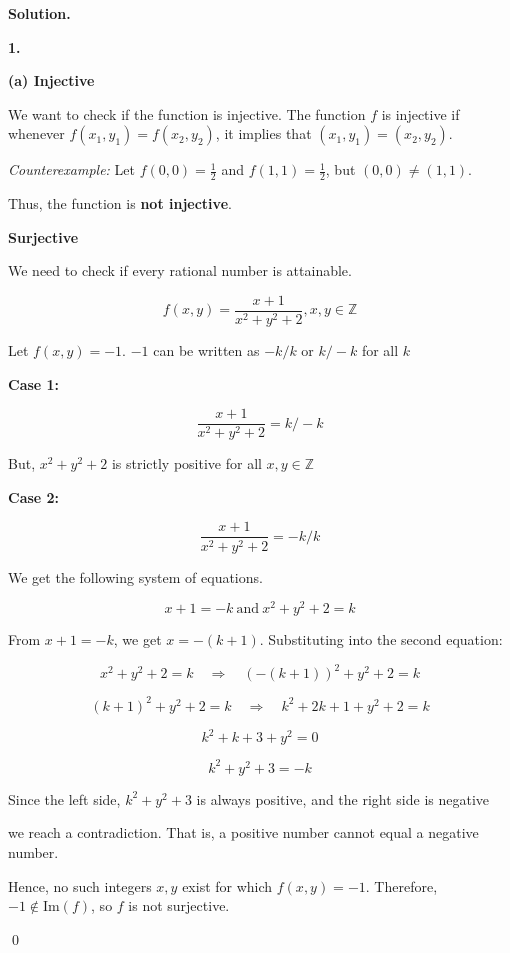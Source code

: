 \documentclass[12pt]{article}
\newenvironment{solution}{%
	\par\medskip
	\noindent\textbf{Solution.}\par\nopagebreak
}{%
	\hfill \qed \par\medskip
}
\begin{document}
	\begin{solution}
		
		\textbf{1.}
		
		\textbf{(a) Injective}
		
		We want to check if the function is injective. The function $f$ is injective if whenever $f(x_1, y_1) = f(x_2, y_2)$, it implies that $(x_1, y_1) = (x_2, y_2)$. 
		
		\textit{Counterexample:}
		Let $f(0, 0) = \frac{1}{2}$ and $f(1, 1) = \frac{1}{2}$, but $(0, 0) \neq (1, 1)$.
		
		Thus, the function is \textbf{not injective}.
		
		\textbf{Surjective}
		
		We need to check if every rational number is attainable.
		
		$$f(x,y) = \frac{x+1}{x^2 + y^2 + 2}, x,y \in \mathbb{Z}$$
		
		Let $f(x,y) = -1$. $-1$ can be written as $-k/k$ or $k/-k$ for all $k$
		
		\textbf{Case 1: } 
		
		$$\frac{x+1}{x^2+y^2+2} = k/-k$$
		
		But, $x^2 + y^2 + 2$ is strictly positive for all $x,y \in \mathbb{Z}$
		
		\textbf{Case 2: }
		
		$$\frac{x+1}{x^2+y^2+2} = -k/k$$
		
		We get the following system of equations.
		
		$$x+ 1 = -k \ \text{and} \ x^2 + y^2 + 2 = k$$
		
		From \( x + 1 = -k \), we get \( x = -(k + 1) \). Substituting into the second equation:
		
		\[
		x^2 + y^2 + 2 = k \quad \Rightarrow \quad (-(k + 1))^2 + y^2 + 2 = k
		\]
		
		\[
		(k + 1)^2 + y^2 + 2 = k \quad \Rightarrow \quad k^2 + 2k + 1 + y^2 + 2 = k
		\]
		
		\[
		k^2 + k + 3 + y^2 = 0
		\]
		
		\[
		k^2 + y^2 + 3 = -k
		\]
		
		Since the left side, $k^2 + y^2 + 3$ is always positive, and the right side is negative
		
		we reach a contradiction. That is, a positive number cannot equal a negative number.
		
		Hence, no such integers \(x, y\) exist for which \(f(x, y) = -1\). Therefore, \(-1 \notin \text{Im}(f)\), so \(f\) is not surjective.
		

\end{solution}
\end{document}
